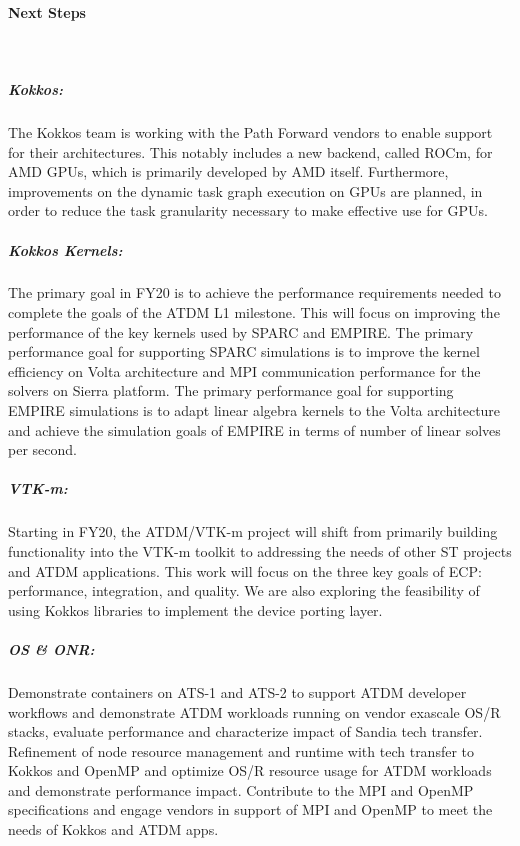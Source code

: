\paragraph{Next Steps} \leavevmode \\


\subparagraph{Kokkos: } The Kokkos team is working with the Path Forward vendors to enable support for their architectures.
This notably includes a new backend, called ROCm, for AMD GPUs, which is primarily developed by AMD itself.
Furthermore, improvements on the dynamic task graph execution on GPUs are planned, in order to reduce the task granularity necessary to make effective use for GPUs.

\subparagraph{Kokkos Kernels:} The primary goal in FY20 is to achieve the performance requirements needed to complete the goals of the ATDM L1 milestone. This will focus on improving the performance of the key kernels used by SPARC and EMPIRE. The primary performance goal for supporting SPARC simulations is to improve the kernel efficiency on Volta architecture and MPI communication performance for the solvers on Sierra platform.  The primary performance goal for supporting EMPIRE simulations is to adapt linear algebra kernels to the Volta architecture and achieve the simulation goals of EMPIRE in terms of number of linear solves per second.
 
\subparagraph{VTK-m:} Starting in FY20, the ATDM/VTK-m project will shift from primarily building functionality into the VTK-m toolkit to addressing the needs of other ST projects and ATDM applications. This work will focus on the three key goals of ECP: performance, integration, and quality. We are also exploring the feasibility of using Kokkos libraries to implement the device porting layer. 

\subparagraph{OS \& ONR:} Demonstrate containers on ATS-1 and ATS-2 to support ATDM developer workflows and demonstrate ATDM workloads running on vendor exascale OS/R stacks, evaluate performance and characterize impact of Sandia tech transfer. Refinement of node resource management and runtime with tech transfer to Kokkos and OpenMP and optimize OS/R resource usage for ATDM workloads and demonstrate performance impact. Contribute to the MPI and OpenMP specifications and engage vendors in support of MPI and OpenMP to meet the needs of Kokkos and ATDM apps.
